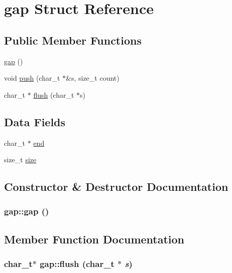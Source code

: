 \hypertarget{structgap}{
\section{gap Struct Reference}
\label{structgap}
}
\subsection*{Public Member Functions}
\begin{CompactItemize}
\item 
\hyperlink{structgap_4ae36e370647da0df57eb30d3bbcd32b}{gap} ()
\item 
void \hyperlink{structgap_9c0d0b12bc778c8439c8aec7747ab2b0}{push} (char\_\-t $\ast$\&s, size\_\-t count)
\item 
char\_\-t $\ast$ \hyperlink{structgap_176c58ee8d57c41b91ae9f00d5e8cab5}{flush} (char\_\-t $\ast$s)
\end{CompactItemize}
\subsection*{Data Fields}
\begin{CompactItemize}
\item 
char\_\-t $\ast$ \hyperlink{structgap_1fafd4d9909a3413f723f24e46dfde0e}{end}
\item 
size\_\-t \hyperlink{structgap_d5bb3597ade78d89bbe0e300748ad508}{size}
\end{CompactItemize}


\subsection{Constructor \& Destructor Documentation}
\hypertarget{structgap_4ae36e370647da0df57eb30d3bbcd32b}{
\subsubsection[gap]{\setlength{\rightskip}{0pt plus 5cm}gap::gap ()}}
\label{structgap_4ae36e370647da0df57eb30d3bbcd32b}




\subsection{Member Function Documentation}
\hypertarget{structgap_176c58ee8d57c41b91ae9f00d5e8cab5}{
\subsubsection[flush]{\setlength{\rightskip}{0pt plus 5cm}char\_\-t$\ast$ gap::flush (char\_\-t $\ast$ {\em s})}}
\label{structgap_176c58ee8d57c41b91ae9f00d5e8cab5}


